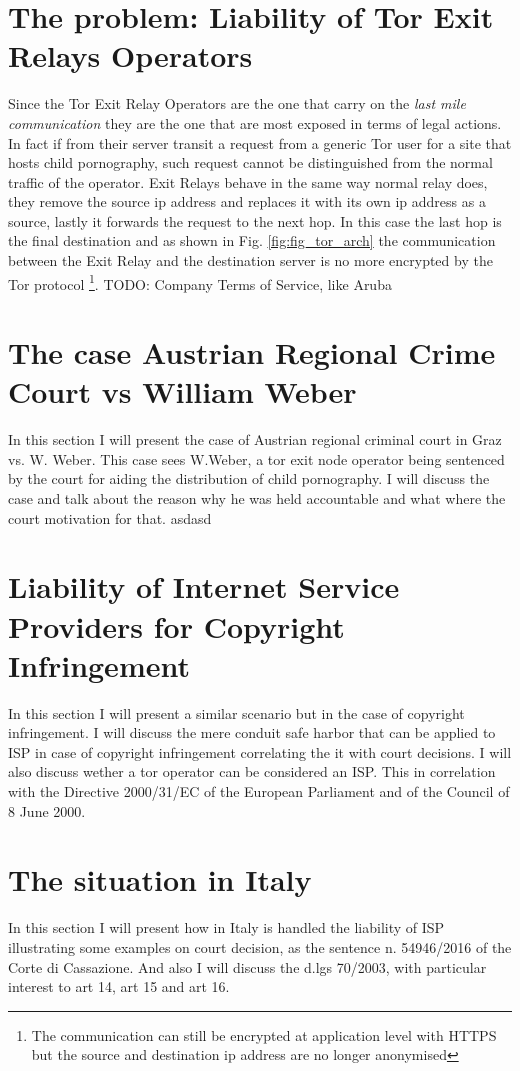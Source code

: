 \documentclass[runningheads,a4paper]{llncs}
\begin{document}
\section{The problem: Liability of Tor Exit Relays Operators}
Since the Tor Exit Relay Operators are the one that carry on the \textit{last mile communication} they are the one that are most exposed in terms of legal actions. In fact if from their server transit a request from a generic Tor user for a site that hosts child pornography, such request cannot be distinguished from the normal traffic of the operator. 
Exit Relays behave in the same way normal relay does, they remove the source ip address and replaces it with its own ip address as a source, lastly it forwards the request to the next hop. In this case the last hop is the final destination and as shown in Fig. \ref{fig:fig_tor_arch} the communication between the Exit Relay and the destination server is no more encrypted by the Tor protocol \footnote{The communication can still be encrypted at application level with HTTPS but the source and destination ip address are no longer anonymised}. 
TODO: Company Terms of Service, like Aruba

\section{The case Austrian Regional Crime Court vs William Weber}
In this section I will present the case of Austrian regional criminal court in Graz vs. W. Weber. This case sees W.Weber, a tor exit node operator being sentenced by the court for aiding the distribution of child pornography. I will discuss the case and talk about the reason why he was held accountable and what where the court motivation for that.
asdasd

\section{Liability of Internet Service Providers for Copyright Infringement}
In this section I will present a similar scenario but in the case of copyright infringement. I will discuss the mere conduit safe harbor that can be applied to ISP in case of copyright infringement correlating the it with court decisions. I will also discuss wether a tor operator can be considered an ISP. This in correlation with the Directive 2000/31/EC of the European Parliament and of the Council of 8 June 2000.

\section{The situation in Italy}
In this section I will present how in Italy is handled the liability of ISP illustrating some examples on court decision, as the sentence n. 54946/2016 of the Corte di Cassazione. And also I will discuss the d.lgs 70/2003, with particular interest to art 14, art 15 and art 16.
\end{document}
